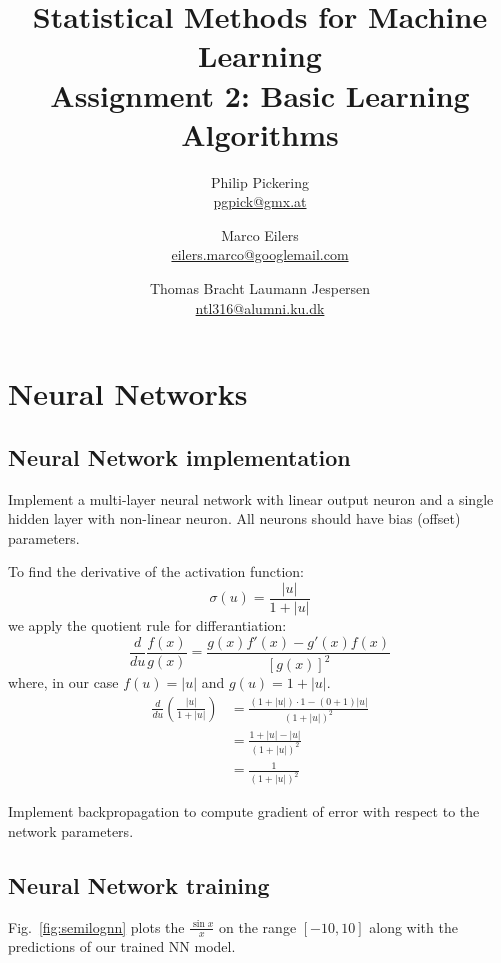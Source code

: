 \documentclass{article}
\author{Philip Pickering\\ \url{pgpick@gmx.at} \and Marco Eilers\\ \url{eilers.marco@googlemail.com} \and Thomas Bracht Laumann Jespersen\\ \url{ntl316@alumni.ku.dk}}
\title{Statistical Methods for Machine Learning\\ Assignment 2: Basic Learning Algorithms}
\date{}
\begin{document}
\maketitle

\section{Neural Networks}

\subsection{Neural Network implementation}

Implement a multi-layer neural network with linear output neuron and a
single hidden layer with non-linear neuron. All neurons should have
bias (offset) parameters.

To find the derivative of the activation function:
\[
\sigma(u) = \frac{|u|}{1 + |u|}
\]
we apply the quotient rule for differantiation:
\[
\frac{d}{du}\frac{f(x)}{g(x)} = \frac{g(x)f'(x) - g'(x)f(x)}{\left[g(x)\right]^2}
\]
where, in our case $f(u) = |u|$ and $g(u) = 1 + |u|$.
\begin{align}
  \frac{d}{du}\left(\frac{|u|}{1 + |u|}\right) &= \frac{(1 + |u|)\cdot 1 - (0 + 1)|u|}{(1 + |u|)^2}\\
  &= \frac{1 + |u| - |u|}{(1 + |u|)^2}\\
  &= \frac{1}{(1 + |u|)^2}
\end{align}

Implement backpropagation to compute gradient of error with respect to
the network parameters.

\subsection{Neural Network training}

Fig.~\ref{fig:semilognn} plots the $\frac{\sin{x}}{x}$ on the range $[-10,10]$ along with the predictions of our trained NN model.
\end{document}
